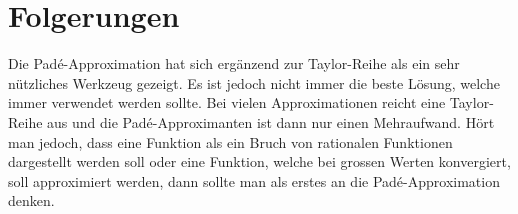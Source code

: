%
%
%
\section{Folgerungen
\label{pade:section:folgerungen}}
Die Padé-Approximation hat sich ergänzend zur Taylor-Reihe als ein sehr nützliches Werkzeug gezeigt.
Es ist jedoch nicht immer die beste Lösung, welche immer verwendet werden sollte.
Bei vielen Approximationen reicht eine Taylor-Reihe aus und die Padé-Approximanten ist dann nur einen Mehraufwand.
Hört man jedoch, dass eine Funktion als ein Bruch von rationalen Funktionen dargestellt werden soll oder  
eine Funktion, welche bei grossen Werten konvergiert, soll approximiert werden, dann sollte man als erstes an die Padé-Approximation denken.




